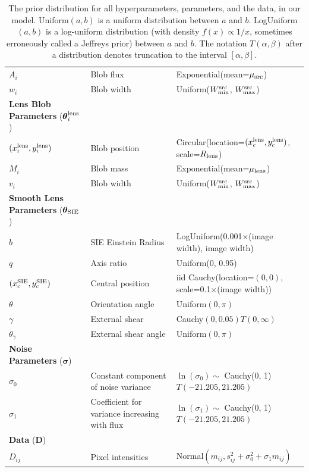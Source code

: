 \documentclass[useAMS,usenatbib]{mn2e}
\begin{document}
\begin{table}
\begin{tabular}{|l|l|l|}
$A_i$  & Blob flux & Exponential(mean=$\mu_{\rm src}$)\\
$w_i$  & Blob width & Uniform($W_{\rm min}^{\rm src}$, $W_{\rm max}^{\rm src}$)\\
\hline
{\bf Lens Blob Parameters} ($\boldsymbol{\theta}_i^{\rm lens}$)\\
\hline
$(x_i^{\rm lens}, y_i^{\rm lens})$ & Blob position & Circular(location=$(x_c^{\rm lens}, y_c^{\rm lens})$, scale=$R_{\rm lens}$) \\
$M_i$  & Blob mass & Exponential(mean=$\mu_{\rm lens}$)\\
$v_i$  & Blob width & Uniform($W_{\rm min}^{\rm src}$, $W_{\rm max}^{\rm src}$)\\
\hline
{\bf Smooth Lens Parameters} ($\boldsymbol{\theta}_{\rm SIE}$)\\
\hline
$b$ & SIE Einstein Radius & LogUniform(0.001$\times$(image width), image width)\\
$q$ & Axis ratio & Uniform(0, 0.95)\\
$(x_c^{\rm SIE}, y_c^{\rm SIE})$ & Central position & iid Cauchy(location=$(0,0)$, scale=0.1$\times$(image width))\\
$\theta$ & Orientation angle & Uniform$(0, \pi)$\\
$\gamma$ & External shear & Cauchy$(0, 0.05)T(0, \infty)$\\
$\theta_\gamma$ & External shear angle & Uniform$(0, \pi)$\\
\hline
{\bf Noise Parameters} ($\boldsymbol{\sigma}$)\\
\hline
$\sigma_0$ & Constant component of noise variance & $\ln(\sigma_0) \sim$ Cauchy(0, 1)$T(-21.205, 21.205)$\\
$\sigma_1$ & Coefficient for variance increasing with flux &
$\ln(\sigma_1) \sim$ Cauchy(0, 1)$T(-21.205, 21.205)$\\
\hline
{\bf Data} ($\boldsymbol{D}$)\\
\hline
$D_{ij}$ & Pixel intensities & Normal$(m_{ij}, s_{ij}^2 + \sigma_0^2 + \sigma_1m_{ij})$
\end{tabular}
\caption{The prior distribution for all hyperparameters, parameters, and the
data, in our model. Uniform$(a, b)$ is a uniform
distribution between $a$ and $b$. LogUniform$(a, b)$ is a log-uniform
distribution (with density $f(x) \propto 1/x$, sometimes erroneously called
a Jeffreys prior) between $a$ and $b$. The notation $T(\alpha, \beta)$ after
a distribution denotes truncation to the interval $[\alpha, \beta]$.
\label{tab:priors}}
\end{table}
\end{document}
